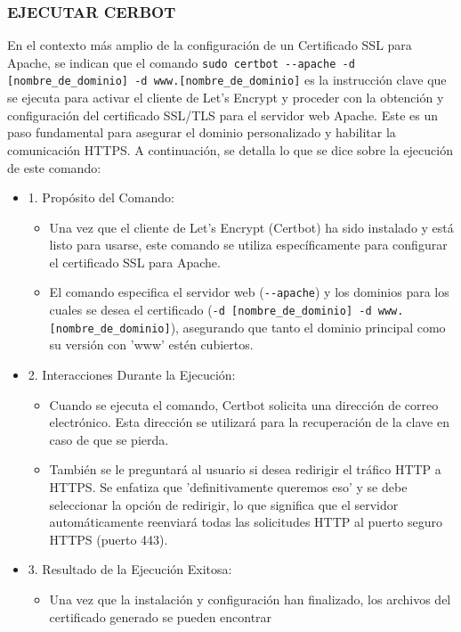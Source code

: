 \documentclass{report}
\begin{document}
\subsubsection{EJECUTAR CERBOT}
En el contexto más amplio de la configuración de un Certificado SSL para Apache, se  indican que el comando 
\verb|sudo certbot --apache -d [nombre_de_dominio] -d www.[nombre_de_dominio]| es la instrucción clave que se ejecuta para activar el 
cliente de Let's Encrypt y proceder con la obtención y configuración del certificado SSL/TLS para el servidor web Apache. Este es un paso 
fundamental para asegurar el dominio personalizado y habilitar la comunicación HTTPS.
A continuación, se detalla lo que se  dice sobre la ejecución de este comando:
\begin{itemize}
    \item 1. Propósito del Comando:
        \begin{itemize}
            \item Una vez que el cliente de Let's Encrypt (Certbot) ha sido instalado y está listo para usarse, este comando se 
            utiliza específicamente para configurar el certificado SSL para Apache.
            \item El comando especifica el servidor web (\verb|--apache|) y los dominios para los cuales se desea el certificado 
            (\verb|-d [nombre_de_dominio] -d www.[nombre_de_dominio]|), asegurando que tanto el dominio principal como su versión con 
            'www' estén cubiertos.
        \end{itemize}
    \item 2. Interacciones Durante la Ejecución:
        \begin{itemize}
            \item Cuando se ejecuta el comando, Certbot solicita una dirección de correo electrónico. Esta dirección se utilizará para la 
            recuperación de la clave en caso de que se pierda.
            \item También se le preguntará al usuario si desea redirigir el tráfico HTTP a HTTPS. Se enfatiza que 
            'definitivamente queremos eso' y se debe seleccionar la opción de redirigir, lo que significa que el servidor automáticamente 
            reenviará todas las solicitudes HTTP al puerto seguro HTTPS (puerto 443).
        \end{itemize}
    \item 3. Resultado de la Ejecución Exitosa:
        \begin{itemize}
            \item Una vez que la instalación y configuración han finalizado, los archivos del certificado generado se pueden encontrar 

\end{itemize}
\end{itemize}
\end{document}
